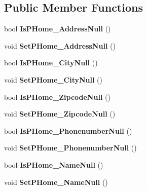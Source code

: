 \subsection*{Public Member Functions}
\begin{DoxyCompactItemize}
\item 
\mbox{\label{class_a_f_h___scheduler_1_1_home_inspection_data_set_1_1_provider___homes_row_a91fd795be2ac76d925109c714e72ea2d}} 
bool {\bfseries Is\+P\+Home\+\_\+\+Address\+Null} ()
\item 
\mbox{\label{class_a_f_h___scheduler_1_1_home_inspection_data_set_1_1_provider___homes_row_a3dea9a7e250c6428831e04a034b79665}} 
void {\bfseries Set\+P\+Home\+\_\+\+Address\+Null} ()
\item 
\mbox{\label{class_a_f_h___scheduler_1_1_home_inspection_data_set_1_1_provider___homes_row_af92285d173fe26bc03125baa26a1323d}} 
bool {\bfseries Is\+P\+Home\+\_\+\+City\+Null} ()
\item 
\mbox{\label{class_a_f_h___scheduler_1_1_home_inspection_data_set_1_1_provider___homes_row_a58b3371c115e54df4735c0ef6d0fd8b8}} 
void {\bfseries Set\+P\+Home\+\_\+\+City\+Null} ()
\item 
\mbox{\label{class_a_f_h___scheduler_1_1_home_inspection_data_set_1_1_provider___homes_row_a303c7560f4ba586938722c173020b231}} 
bool {\bfseries Is\+P\+Home\+\_\+\+Zipcode\+Null} ()
\item 
\mbox{\label{class_a_f_h___scheduler_1_1_home_inspection_data_set_1_1_provider___homes_row_ab848e5b378a997ee6b747c938c3a5791}} 
void {\bfseries Set\+P\+Home\+\_\+\+Zipcode\+Null} ()
\item 
\mbox{\label{class_a_f_h___scheduler_1_1_home_inspection_data_set_1_1_provider___homes_row_aec82f083eda856ce36b6dec2465a2f67}} 
bool {\bfseries Is\+P\+Home\+\_\+\+Phonenumber\+Null} ()
\item 
\mbox{\label{class_a_f_h___scheduler_1_1_home_inspection_data_set_1_1_provider___homes_row_ab5e03119dcc87e1ca46347f0a406f2f5}} 
void {\bfseries Set\+P\+Home\+\_\+\+Phonenumber\+Null} ()
\item 
\mbox{\label{class_a_f_h___scheduler_1_1_home_inspection_data_set_1_1_provider___homes_row_a333760cec7e8c732068adf411f60c498}} 
bool {\bfseries Is\+P\+Home\+\_\+\+Name\+Null} ()
\item 
\mbox{\label{class_a_f_h___scheduler_1_1_home_inspection_data_set_1_1_provider___homes_row_ac6895aa8658a1c400377bc19f1a0b4a9}} 
void {\bfseries Set\+P\+Home\+\_\+\+Name\+Null} ()
\item 
\mbox{\label{class_a_f_h___scheduler_1_1_home_inspection_data_set_1_1_provider___homes_row_a4c05267dd782fd66133f2efbb2c73d50}} 

\end{DoxyCompactItemize}
